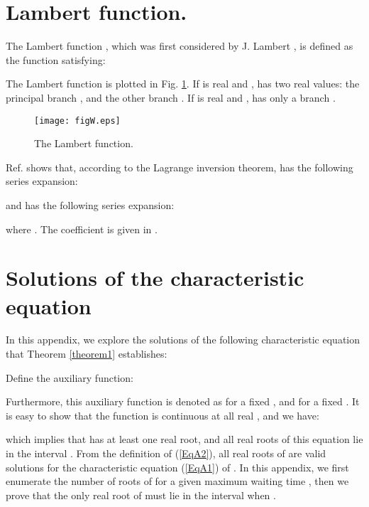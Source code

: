 \documentclass[journal]{IEEEtran}
\begin{document}
\appendices
\section{Lambert  function.}\label{appendixW}
The Lambert  function , which was first considered by J. Lambert \cite{14corless1996lambertw}, is defined as the function satisfying:

The Lambert  function  is plotted in Fig. \ref{figW}. If  is real and ,  has two real values: the principal branch , and the other branch . If  is real and ,  has only a branch .

\begin{figure}[t]
\centering
\texttt{[image: figW.eps]}
\caption{The Lambert  function.}\label{figW}
\end{figure}

Ref. \cite{14corless1996lambertw} shows that, according to the Lagrange inversion theorem,  has the following series expansion:

and  has the following series expansion:

where . The coefficient  is given in \cite{14corless1996lambertw}.

\section{Solutions of the characteristic equation}\label{appendixchar}
In this appendix, we explore the solutions of the following characteristic equation that Theorem \ref{theorem1} establishes:

Define the auxiliary function:

Furthermore, this auxiliary function is denoted as  for a fixed , and  for a fixed . It is easy to show that the function  is continuous at all real , and we have:

which implies that  has at least one real root, and all real roots of this equation lie in the interval . From the definition of (\ref{EqA2}), all real roots of  are valid solutions for the characteristic equation (\ref{EqA1}) of . In this appendix, we first enumerate the number of roots of  for a given maximum waiting time , then we prove that the only real root of  must lie in the interval   when .
\end{document}
